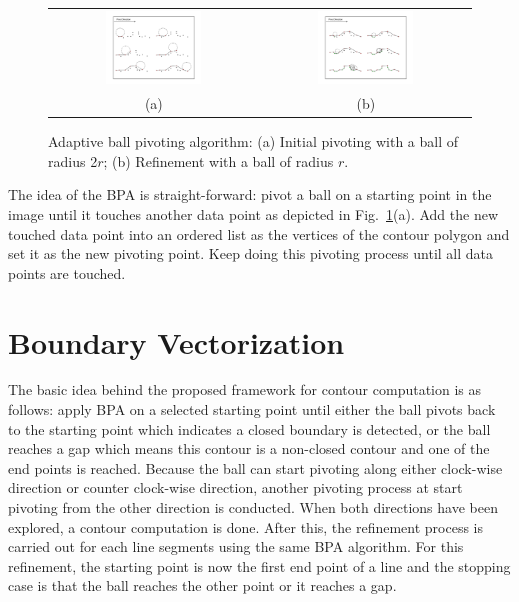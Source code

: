 \documentclass{article}
\newcommand{\Figa}[1]{Fig.~\ref{fig:#1}(a)}
\begin{document}
\begin{figure}[hbtp]
\begin{center}
\begin{tabular}{cc}
\includegraphics[width=0.48\textwidth]{figures/BPA_init.pdf} &
\includegraphics[width=0.48\textwidth]{figures/BPA_refine.pdf} \\
(a) & (b)
\end{tabular}
\end{center}
\caption{Adaptive ball pivoting algorithm:
(a) Initial pivoting with a ball of radius 2$r$;
(b) Refinement with a ball of radius $r$.}
\label{fig:BPA}
\end{figure}


The idea of the BPA is straight-forward:
pivot a ball on a starting point in the image
until it touches another data point as depicted in \Figa{BPA}.
Add the new touched
data point into an ordered list as the vertices of the contour polygon and
set it as the new pivoting point.
Keep doing this pivoting process until all data points are touched.

\section{Boundary Vectorization}
The basic idea behind the proposed framework for contour computation is as follows:
apply BPA on a selected starting point until
either the ball pivots back to the starting point which indicates a closed boundary is detected,
or the ball reaches a gap which means this contour is a non-closed
contour and one of the end points is reached.
Because the ball can start pivoting along either clock-wise direction or counter clock-wise direction,
another pivoting process at start pivoting from the other direction is conducted.
When both directions have been explored, a contour computation is done.
After this, the refinement process is carried out for each line segments using the same BPA algorithm.
For this refinement, the starting point is now the first end point of a line
and the stopping case is that the ball reaches the other point or it
reaches a gap.
\end{document}
